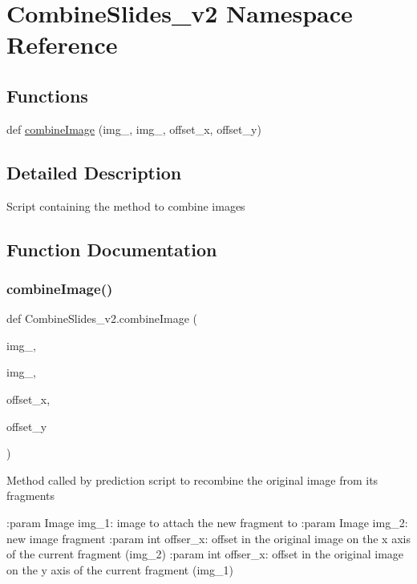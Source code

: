 \hypertarget{namespaceCombineSlides__v2}{}\section{Combine\+Slides\+\_\+v2 Namespace Reference}
\label{namespaceCombineSlides__v2}
\subsection*{Functions}
\begin{DoxyCompactItemize}
\item 
def \mbox{\hyperlink{namespaceCombineSlides__v2_a40f52b77f4cc7417e0284807488564f5}{combine\+Image}} (img\+\_, img\+\_, offset\+\_\+x, offset\+\_\+y)
\end{DoxyCompactItemize}


\subsection{Detailed Description}
\begin{DoxyVerb}Script containing the method to combine images
\end{DoxyVerb}
 

\subsection{Function Documentation}
\mbox{\label{namespaceCombineSlides__v2_a40f52b77f4cc7417e0284807488564f5}} 
\subsubsection{\texorpdfstring{combine\+Image()}{combineImage()}}
{\footnotesize\ttfamily def Combine\+Slides\+\_\+v2.\+combine\+Image (\begin{DoxyParamCaption}\item[{}]{img\+\_,  }\item[{}]{img\+\_,  }\item[{}]{offset\+\_\+x,  }\item[{}]{offset\+\_\+y }\end{DoxyParamCaption})}

\begin{DoxyVerb}Method called by prediction script to recombine the original image from its fragments

:param Image img_1: image to attach the new fragment to
:param Image img_2: new image fragment
:param int offser_x: offset in the original image on the x axis of the current fragment (img_2)
:param int offser_x: offset in the original image on the y axis of the current fragment (img_1)
\end{DoxyVerb}
 